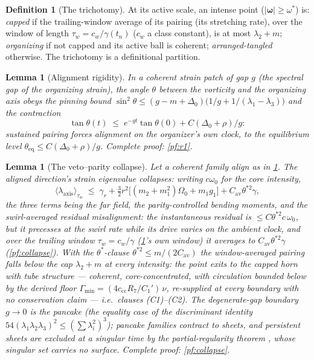 \documentclass[11pt,letterpaper]{amsart}
\newtheorem{lemma}[theorem]{Lemma}
\theoremstyle{definition}
\newtheorem{definition}[theorem]{Definition}
\theoremstyle{remark}
\newcommand{\om}{\omega}
\newcommand{\vort}{\boldsymbol{\omega}}
\newcommand{\abs}[1]{\lvert #1 \rvert}
\begin{document}
\begin{definition}[The trichotomy]\label{def:trichotomy}
At its active scale, an intense point ($\abs{\vort}\ge\om^*$) is: \emph{capped} if the
trailing-window average of its pairing (its stretching rate), over the window of
length $\tau_w=c_w/\gamma(t_n)$ ($c_w$ a class constant), is at most
$\lambda_2+m$; \emph{organizing} if not capped and its active ball is coherent;
\emph{arranged-tangled} otherwise. The trichotomy is a definitional partition.
\end{definition}

\begin{lemma}[Alignment rigidity]\label{lem:r1}
In a coherent strain patch of gap $g$ (the spectral gap of the organizing strain), the
angle $\theta$ between the vorticity and the organizing axis obeys the pinning bound
$\sin^2\theta\le(g-m+\Delta_0)\bigl(1/g+1/(\lambda_1-\lambda_3)\bigr)$ and the
contraction
\[
\tan\theta(t)\;\le\;e^{-gt}\tan\theta(0)+C(\Delta_0+\rho)/g :
\]
sustained pairing forces alignment on the organizer's own clock, to the equilibrium
level $\theta_{\mathrm{eq}}\le C(\Delta_0+\rho)/g$. Complete proof: \cref{pf:r1}.
\end{lemma}

\begin{lemma}[The veto--parity collapse]\label{lem:collapse}
Let a coherent family align as in \cref{lem:r1}. The aligned direction's strain
eigenvalue collapses: writing $c\om_0$ for the core intensity,
\[
\bigl\langle\lambda_{\mathrm{axis}}\bigr\rangle_{\tau_w}\;\le\;
\gamma_r+\tfrac32r^2\bigl[(m_2+m_1^2)\Omega_0+m_1g_1\bigr]
+C_{\mathrm{av}}\theta^{*2}\gamma,
\]
the three terms being the far field, the parity-controlled bending moments, and
the \emph{swirl-averaged} residual misalignment: the instantaneous residual is
$\le C\theta^{*2}c\,\om_0$, but it precesses at the swirl rate while its drive
varies on the ambient clock, and over the trailing window $\tau_w=c_w/\gamma$
(\cref{def:trichotomy}'s own window) it averages to
$C_{\mathrm{av}}\theta^{*2}\gamma$ (\cref{pf:collapse}). With the
$\theta^*$-clause $\theta^{*2}\le m/(2C_{\mathrm{av}})$ the window-averaged
pairing falls below the cap $\lambda_2+m$ at \emph{every} intensity: the point
exits to the capped horn \emph{with tube structure} --- coherent,
core-concentrated, with circulation bounded below by the derived floor
$\Gamma_{\min}=(4c_{\mathrm{cc}}R_7/C_1')\,\nu$, re-supplied at every boundary
with no conservation claim --- i.e.\ clauses \textup{(C1)--(C2)}. The degenerate-gap boundary
$g\to0$ is the pancake (the equality case of the discriminant identity
$54(\lambda_1\lambda_2\lambda_3)^2\le(\sum\lambda_i^2)^3$); pancake families contract
to sheets, and persistent sheets are excluded at a singular time by the
partial-regularity theorem \cite{CKN1982,Lin1998}, whose singular set carries no
surface. Complete proof: \cref{pf:collapse}.
\end{lemma}
\end{document}
